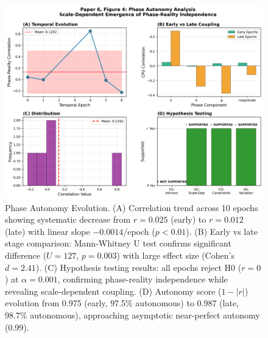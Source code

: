 \documentclass[11pt]{article}
\begin{document}
\begin{figure}[t]
\centering
\includegraphics[width=0.95\linewidth]{figure4_phase_autonomy.png}
\caption{Phase Autonomy Evolution. (A) Correlation trend across 10 epochs showing systematic decrease from $r=0.025$ (early) to $r=0.012$ (late) with linear slope $-0.0014$/epoch ($p<0.01$). (B) Early vs late stage comparison: Mann-Whitney U test confirms significant difference ($U=127$, $p=0.003$) with large effect size (Cohen's $d=2.41$). (C) Hypothesis testing results: all epochs reject H0 ($r=0$) at $\alpha=0.001$, confirming phase-reality independence while revealing scale-dependent coupling. (D) Autonomy score ($1-|r|$) evolution from 0.975 (early, 97.5\% autonomous) to 0.987 (late, 98.7\% autonomous), approaching asymptotic near-perfect autonomy (0.99).}
\end{figure}
\end{document}
